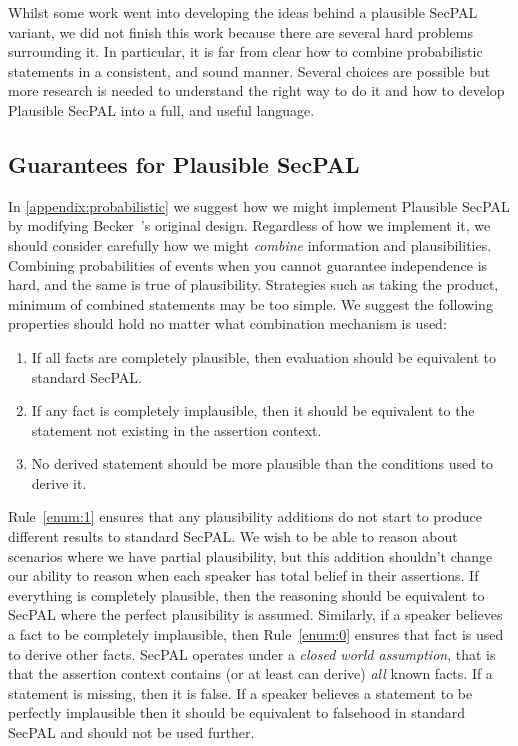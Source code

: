 \documentclass[thesis.tex]{subfiles}
\begin{document}
Whilst some work went into developing the ideas behind a plausible SecPAL
variant, we did not finish this work because there are several hard problems
surrounding it. In particular, it is far from clear how to combine probabilistic
statements in a consistent, and sound manner. Several choices are possible but
more research is needed to understand the right way to do it and how to develop
Plausible SecPAL into a full, and useful language.


\subsection{Guarantees for Plausible SecPAL} 

In \autoref{appendix:probabilistic} we suggest how we might implement
Plausible SecPAL by modifying Becker~\etal's original
design. Regardless of how we implement it, we should consider
carefully how we might \emph{combine} information and
plausibilities. Combining probabilities of events when you cannot
guarantee independence is hard, and the same is true of
plausibility. Strategies such as taking the product, minimum of
combined statements may be too simple. We suggest the following
properties should hold no matter what combination mechanism is used:

\begin{enumerate}
\item \label{enum:1} If all facts are completely plausible, then evaluation should be
  equivalent to standard SecPAL.
\item \label{enum:0} If any fact is completely  implausible, then it should be equivalent
  to the statement not existing in the assertion context.
\item \label{enum:grow} No derived statement should be more plausible than the conditions used
  to derive it.
\end{enumerate}

Rule~\ref{enum:1} ensures that any plausibility additions do not start to
produce different results to standard SecPAL. We wish to be able to reason about
scenarios where we have partial plausibility, but this addition shouldn't change
our ability to reason when each speaker has total belief in their assertions. If
everything is completely plausible, then the reasoning should be equivalent to
SecPAL where the perfect plausibility is assumed. Similarly, if a speaker
believes a fact to be completely implausible, then Rule~\ref{enum:0} ensures that
fact is used to derive other facts. SecPAL operates under a \emph{closed world
assumption}, that is that the assertion context contains (or at least can
derive) \emph{all} known facts. If a statement is missing, then it is false. If a
speaker believes a statement to be perfectly implausible then it should be
equivalent to falsehood in standard SecPAL and should not be used further.
\end{document}
